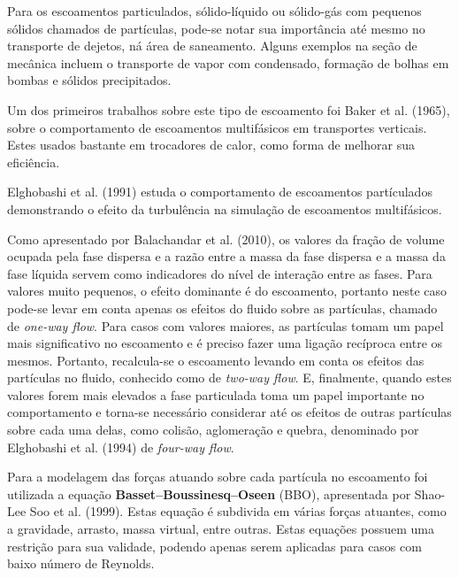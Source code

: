 Para os escoamentos particulados, sólido-líquido ou sólido-gás com pequenos sólidos chamados de partículas, pode-se notar sua importância até mesmo no transporte de dejetos, ná área de saneamento.%
Alguns exemplos na seção de mecânica incluem o transporte de vapor com condensado, formação de bolhas em bombas e sólidos precipitados.

Um dos primeiros trabalhos sobre este tipo de escoamento foi Baker et al. (1965)\cite{Baker-1965}, sobre o comportamento de escoamentos multifásicos em transportes verticais.
Estes usados bastante em trocadores de calor, como forma de melhorar sua eficiência.

Elghobashi et al. (1991)\cite{Elghobashi-1991} estuda o comportamento de escoamentos partículados demonstrando o efeito da turbulência na simulação de escoamentos multifásicos.

Como apresentado por Balachandar et al. (2010)\cite{Balachandar-2010}, os valores da fração de volume ocupada pela fase dispersa e a razão entre a massa da fase dispersa e a massa da fase líquida servem como indicadores do nível de interação entre as fases.
Para valores muito pequenos, o efeito dominante é do escoamento, portanto neste caso pode-se levar em conta apenas os efeitos do fluido sobre as partículas, chamado de \textit{one-way flow}.
Para casos com valores maiores, as partículas tomam um papel mais significativo no escoamento e é preciso fazer uma ligação recíproca entre os mesmos.
Portanto, recalcula-se o escoamento levando em conta os efeitos das partículas no fluido, conhecido como de \textit{two-way flow}.
E, finalmente, quando estes valores forem mais elevados a fase particulada toma um papel importante no comportamento e torna-se necessário considerar até os efeitos de outras partículas sobre cada uma delas, como colisão, aglomeração e quebra, denominado por Elghobashi et al. (1994)\cite{Elghobashi-1994} de \textit{four-way flow}.

Para a modelagem das forças atuando sobre cada partícula no escoamento foi utilizada a equação \textbf{Basset–Boussinesq–Oseen} (BBO), apresentada por Shao-Lee Soo et al. (1999)\cite{ShaoLeeSoo-1999}.
Estas equação é subdivida em várias forças atuantes, como a gravidade, arrasto, massa virtual, entre outras.
Estas equações possuem uma restrição para sua validade, podendo apenas serem aplicadas para casos com baixo número de Reynolds.


